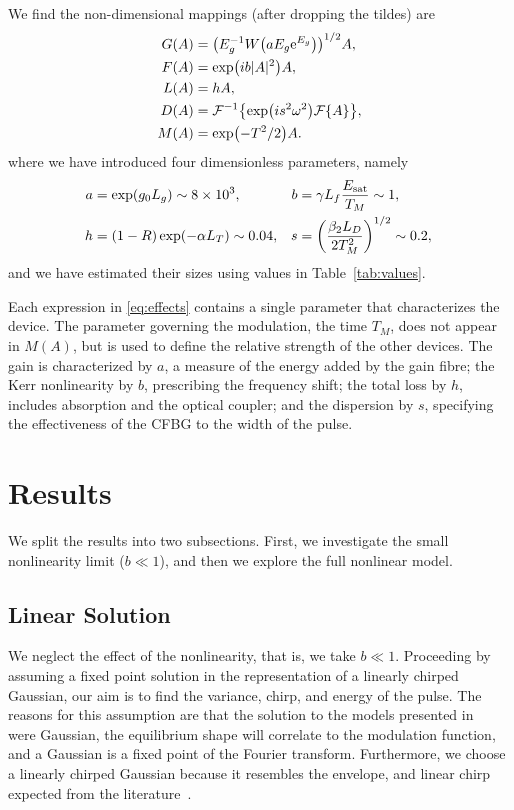 \documentclass[9pt,twocolumn,twoside]{osajnl}
\let\originalleft\left
\let\originalright\right
\renewcommand{\left}{\mathopen{}\mathclose\bgroup\originalleft}
\renewcommand{\right}{\aftergroup\egroup\originalright}
\newcommand{\Es}{E_{\textrm{sat}}} %
\newcommand{\FT}[1]{\mathcal{F}\left\{ #1 \right\}} %
\newcommand{\FTi}[1]{\mathcal{F}^{-1}\left\{ #1 \right\}} %
\begin{document}
We find the non-dimensional mappings (after dropping the tildes) are
\begin{equation}
	\begin{aligned}
		G(A) &= \left(E_g^{-1} W \left( a E_g \textrm{e}^{E_g}\right) \right)^{1/2} A,\\
		F(A) &= \exp \left( i b |A|^2 \right) A, \\
		L(A) &= h A, \\
		D(A) &= \FTi{\exp \left( i s^2 \omega^2 \right) \FT{A}}, \\
		M(A) &= \exp \left( -T^2 / 2 \right) A.
	\end{aligned}
	\label{eq:effects}
\end{equation}
where we have introduced four dimensionless parameters, namely
\begin{equation}
	\hspace*{-1mm}
	\begin{aligned}
		a &= \exp( g_0 L_g ) \sim 8 \times 10^3, & 
		b &= \gamma L_f \frac{\Es}{T_M} \sim 1, \\
		h &= (1 - R) \exp( - \alpha L_T) \sim 0.04, &
		s &= \left( \frac{\beta_2 L_D}{2 T_M^2} \right)^{1/2} \sim 0.2,	
	\end{aligned}
	\label{eq:ndparam}
\end{equation}
and we have estimated their sizes using values in Table~\ref{tab:values}.

Each expression in \eqref{eq:effects} contains a single parameter that characterizes the device. The parameter governing the modulation, the time $T_M$, does not appear in $M(A)$, but is used to define the relative strength of the other devices. The gain is characterized by $a$, a measure of the energy added by the gain fibre; the Kerr nonlinearity by $b$, prescribing the frequency shift; the total loss by $h$, includes absorption and the optical coupler; and the dispersion by $s$, specifying the effectiveness of the CFBG to the width of the pulse.

\section{Results}
\label{sec:results}
We split the results into two subsections. First, we investigate the small nonlinearity limit ($b \ll 1$), and then we explore the full nonlinear model.

\subsection{Linear Solution}
We neglect the effect of the nonlinearity, that is, we take $b \ll 1$. Proceeding by assuming a fixed point solution in the representation of a linearly chirped Gaussian, our aim is to find the variance, chirp, and energy of the pulse. The reasons for this assumption are that the solution to the models presented in~\cite{cutler1955, siegman1969, kuizenga1970a, martinez1984, martinez1985} were Gaussian, the equilibrium shape will correlate to the modulation function, and a Gaussian is a fixed point of the Fourier transform. Furthermore, we choose a linearly chirped Gaussian because it resembles the envelope, and linear chirp expected from the literature~\cite{burgoyne2014, haus1975, haus1996, haus2000, usechak2005}.
\end{document}
